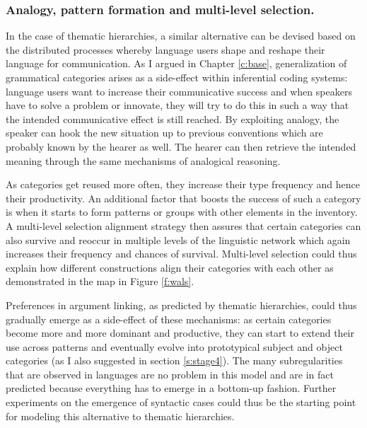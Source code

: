 \subsubsection{Analogy, pattern formation and multi-level selection.}

In the case of thematic hierarchies, a similar alternative can be devised based on the distributed processes whereby language users shape and reshape their language for communication. As I argued in Chapter \ref{c:base}, generalization of grammatical categories arises as a side-effect within inferential coding systems: language users want to increase their communicative success and when speakers have to solve a problem or innovate, they will try to do this in such a way that the intended communicative effect is still reached. By exploiting analogy, the speaker can hook the new situation up to previous conventions which are probably known by the hearer as well. The hearer can then retrieve the intended meaning through the same mechanisms of analogical reasoning.

As categories get reused more often, they increase their type frequency and hence their productivity. An additional factor that boosts the success of such a category is when it starts to form patterns or groups with other elements in the inventory. A multi-level selection alignment strategy then assures that certain categories can also survive and reoccur in multiple levels of the linguistic network which again increases their frequency and chances of survival. Multi-level selection could thus explain how different constructions align their categories with each other as demonstrated in the map in Figure \ref{f:wals}.

Preferences in argument linking, as predicted by thematic hierarchies, could thus gradually emerge as a side-effect of these mechanisms: as certain categories become more and more dominant and productive, they can start to extend their use across patterns and eventually evolve into prototypical subject and object categories (as I also suggested in section \ref{s:stage4}). The many subregularities that are observed in languages are no problem in this model and are in fact predicted because everything has to emerge in a bottom-up fashion. Further experiments on the emergence of syntactic cases could thus be the starting point for modeling this alternative to thematic hierarchies.


